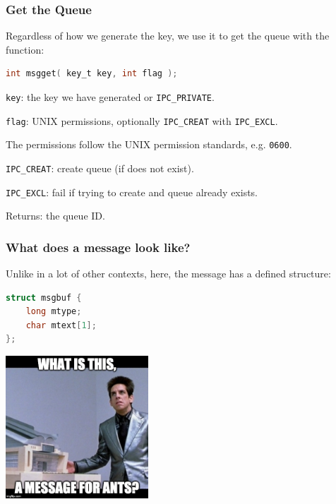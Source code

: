 \begin{frame}[fragile]
\frametitle{Get the Queue}
Regardless of how we generate the key, we use it to get the queue with the function:
\begin{lstlisting}[language=C]
int msgget( key_t key, int flag );
\end{lstlisting}

\texttt{key}: the key we have generated or \texttt{IPC\_PRIVATE}.

\texttt{flag}: UNIX permissions, optionally \texttt{IPC\_CREAT} with \texttt{IPC\_EXCL}. 

The  permissions follow the UNIX permission standards, e.g. \texttt{0600}.

\texttt{IPC\_CREAT}: create queue (if does not exist).

\texttt{IPC\_EXCL}: fail if trying to create and queue already exists.

Returns: the queue ID.

\end{frame}


\begin{frame}[fragile]
\frametitle{What does a message look like?}

Unlike in a lot of other contexts, here, the message has a defined structure: 

\begin{lstlisting}[language=C]
struct msgbuf {
    long mtype;
    char mtext[1];
};
\end{lstlisting}

\begin{center}
	\includegraphics[width=0.4\textwidth]{images/zoolander.jpg}
\end{center}

\end{frame}

